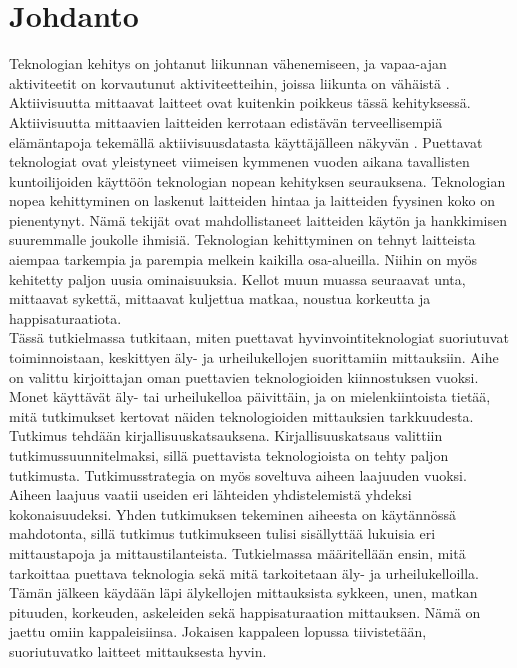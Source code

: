 \documentclass[utf8,bachelor,finnish]{bachelor}
\begin{document}
\chapter{Johdanto}
  Teknologian kehitys on johtanut liikunnan vähenemiseen, ja vapaa-ajan aktiviteetit on korvautunut aktiviteetteihin, joissa liikunta on vähäistä \parencite{petrusevski_interventions_2021}.
   Aktiivisuutta mittaavat laitteet ovat kuitenkin poikkeus tässä kehityksessä. Aktiivisuutta mittaavien laitteiden kerrotaan edistävän terveellisempiä elämäntapoja
    tekemällä aktiivisuusdatasta käyttäjälleen näkyvän \parencite{shin2015understanding}.
     Puettavat teknologiat ovat yleistyneet viimeisen kymmenen vuoden aikana tavallisten kuntoilijoiden käyttöön teknologian nopean kehityksen seurauksena.
      Teknologian nopea kehittyminen on laskenut laitteiden hintaa ja laitteiden fyysinen koko on pienentynyt. Nämä tekijät ovat mahdollistaneet laitteiden käytön ja hankkimisen suuremmalle joukolle ihmisiä.
       Teknologian kehittyminen on tehnyt laitteista aiempaa tarkempia ja parempia melkein kaikilla osa-alueilla. Niihin on myös kehitetty paljon uusia ominaisuuksia.
        Kellot muun muassa seuraavat unta, mittaavat sykettä, mittaavat kuljettua matkaa, noustua korkeutta ja happisaturaatiota.\\

  Tässä tutkielmassa tutkitaan, miten puettavat hyvinvointiteknologiat suoriutuvat toiminnoistaan, keskittyen äly- ja urheilukellojen suorittamiin mittauksiin.
   Aihe on valittu kirjoittajan oman puettavien teknologioiden kiinnostuksen vuoksi. Monet käyttävät äly- tai urheilukelloa päivittäin, ja on mielenkiintoista tietää, mitä tutkimukset kertovat
    näiden teknologioiden mittauksien tarkkuudesta. \\
    
  Tutkimus tehdään kirjallisuuskatsauksena. Kirjallisuuskatsaus valittiin tutkimussuunnitelmaksi, sillä puettavista teknologioista on tehty paljon tutkimusta.
   Tutkimusstrategia on myös soveltuva aiheen laajuuden vuoksi. Aiheen laajuus vaatii useiden eri lähteiden yhdistelemistä yhdeksi kokonaisuudeksi. Yhden tutkimuksen tekeminen aiheesta on käytännössä mahdotonta,
    sillä tutkimus tutkimukseen tulisi sisällyttää lukuisia eri mittaustapoja ja mittaustilanteista. Tutkielmassa määritellään ensin, mitä tarkoittaa puettava teknologia
     sekä mitä tarkoitetaan äly- ja urheilukelloilla. Tämän jälkeen käydään läpi älykellojen mittauksista sykkeen, unen, matkan pituuden, korkeuden, askeleiden sekä
      happisaturaation mittauksen. Nämä on jaettu omiin kappaleisiinsa. Jokaisen kappaleen lopussa tiivistetään, suoriutuvatko laitteet mittauksesta hyvin.
\end{document}
